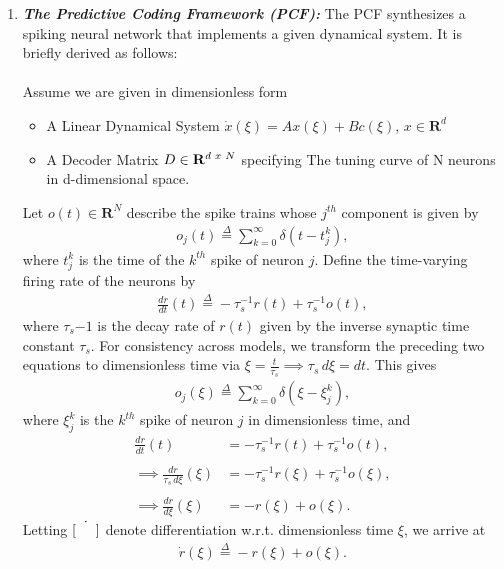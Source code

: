 \begin{enumerate}

\item \textbf{\textit{The Predictive Coding Framework (PCF):}} The PCF synthesizes a spiking neural network that implements a given dynamical system. It is briefly derived as follows:\\
\\
Assume we are given in dimensionless form
\begin{itemize}
    \item A Linear Dynamical System  $\dot{x}(\xi) = A x(\xi) + B c(\xi)$,  $x \in \mathbf{R}^d$
    
    \item A Decoder Matrix $D \in \mathbf{R}^{d\hspace{1mm} x \hspace{1mm}N}$ specifying The tuning curve of N neurons in d-dimensional space. \\
\end{itemize}
Let $o(t) \in \mathbf{R}^{N}$ describe the spike trains whose $j^{th}$ component is given by
\begin{align*}
	o_j(t) \overset{\Delta}{=} \sum_{k=0}^{\infty} \delta(t - t_j^k),
\end{align*} 
where $t_j^k$ is the time of the $k^{th}$ spike of neuron $j$. 
Define the time-varying firing rate of the neurons by 
\begin{align*}
	\frac{d r}{d t}(t) \overset{\Delta}{=} - \tau_s^{-1} r(t) + \tau_s^{-1} o(t),
\end{align*}
where $\tau_s{-1}$ is the decay rate of $r(t)$ given by the inverse synaptic time constant $\tau_s$. For consistency across models, we transform the preceding two equations to dimensionless time via $\xi = \frac{t}{\tau_s} \implies  \tau_s \, d \xi = dt$. This gives
\begin{align}
	\label{eq:analysis:comparison_sc_vs_pcf_vs_gj:pcf_o_def}
	o_j(\xi) \overset{\Delta}{=} \sum_{k=0}^{\infty} \delta(\xi - \xi_j^k),
\end{align}
where $\xi_j^k$ is the $k^{th}$ spike of neuron $j$ in dimensionless time, and
\begin{align*}
	\frac{d r}{d t}(t) &= - \tau_s^{-1} r(t) + \tau_s^{-1}o(t),
	\\
	\\
	\implies
	\frac{d r}{\tau_s \, d \xi}(\xi) &= - \tau_s^{-1} r(\xi) + \tau_s^{-1} o(\xi),
	\\
	\\
	\implies
	\frac{dr}{d\xi}(\xi) &= - r(\xi) + o(\xi).
\end{align*}    
Letting $\dot{\left[ \hspace{5mm} \right]}$ denote differentiation w.r.t. dimensionless time $\xi$, we arrive at 
\begin{align}
\label{eq:analysis:comparison_sc_vs_pcf_vs_gj:pcf_r_def}
\dot{r}(\xi) \overset{\Delta}{=} - r(\xi) + o(\xi). 
\end{align}


\end{enumerate}
